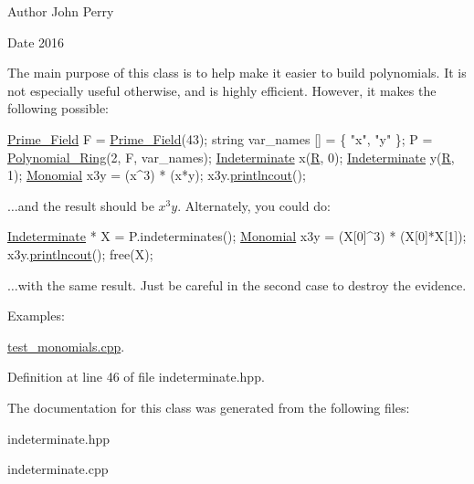 \begin{DoxyAuthor}{Author}
John Perry
\end{DoxyAuthor}
\begin{DoxyDate}{Date}
2016
\end{DoxyDate}
The main purpose of this class is to help make it easier to build polynomials. It is not especially useful otherwise, and is highly efficient. However, it makes the following possible\+: 
\begin{DoxyCode}
\hyperlink{class_prime___field}{Prime\_Field} F = \hyperlink{class_prime___field}{Prime\_Field}(43);
\textcolor{keywordtype}{string} var\_names [] = \{ \textcolor{stringliteral}{"x"}, \textcolor{stringliteral}{"y"} \};
P = \hyperlink{class_polynomial___ring}{Polynomial\_Ring}(2, F, var\_names);
\hyperlink{class_indeterminate}{Indeterminate} x(\hyperlink{class_indeterminate_a78f5339712602f11e29a091d228032c4}{R}, 0);
\hyperlink{class_indeterminate}{Indeterminate} y(\hyperlink{class_indeterminate_a78f5339712602f11e29a091d228032c4}{R}, 1);
\hyperlink{class_monomial}{Monomial} x3y = (x^3) * (x*y);
x3y.\hyperlink{class_monomial_a339f1927077ab6d92b050d222d945f72}{printlncout}();
\end{DoxyCode}
 {$\dots$}and the result should be $x^3y$. Alternately, you could do\+: 
\begin{DoxyCode}
\hyperlink{class_indeterminate}{Indeterminate} * X = P.indeterminates();
\hyperlink{class_monomial}{Monomial} x3y = (X[0]^3) * (X[0]*X[1]);
x3y.\hyperlink{class_monomial_a339f1927077ab6d92b050d222d945f72}{printlncout}();
free(X);
\end{DoxyCode}
 {$\dots$}with the same result. Just be careful in the second case to destroy the evidence. \begin{Desc}
\item[Examples\+: ]\par
\hyperlink{test_monomials_8cpp-example}{test\+\_\+monomials.\+cpp}.\end{Desc}


Definition at line 46 of file indeterminate.\+hpp.



The documentation for this class was generated from the following files\+:\begin{DoxyCompactItemize}
\item 
indeterminate.\+hpp\item 
indeterminate.\+cpp\end{DoxyCompactItemize}
